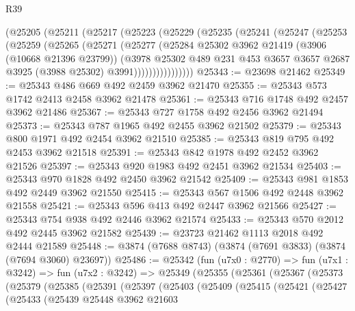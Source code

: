 \begin{lexlean}{R39}
\begin{coremodule}
      (@25205
        (@25211
          (@25217
            (@25223
              (@25229
                (@25235
                  (@25241
                    (@25247
                      (@25253
                        (@25259
                          (@25265
                            (@25271
                              (@25277
                                (@25284
                                  @25302
                                  @3962
                                  @21419
                                  (@3906 (@10668 @21396 @23799))
                                  (@3978
                                    @25302
                                    @489
                                    @231
                                    @453
                                    @3657
                                    @3657
                                    @2687
                                    @3925
                                    (@3988 @25302)
                                    @3991))))))))))))))))
@25343 := @23698 @21462
@25349 := @25343 @486 @669 @492 @2459 @3962 @21470
@25355 := @25343 @573 @1742 @2413 @2458 @3962 @21478
@25361 := @25343 @716 @1748 @492 @2457 @3962 @21486
@25367 := @25343 @727 @1758 @492 @2456 @3962 @21494
@25373 := @25343 @787 @1965 @492 @2455 @3962 @21502
@25379 := @25343 @800 @1971 @492 @2454 @3962 @21510
@25385 := @25343 @819 @795 @492 @2453 @3962 @21518
@25391 := @25343 @842 @1978 @492 @2452 @3962 @21526
@25397 := @25343 @920 @1983 @492 @2451 @3962 @21534
@25403 := @25343 @970 @1828 @492 @2450 @3962 @21542
@25409 := @25343 @981 @1853 @492 @2449 @3962 @21550
@25415 := @25343 @567 @1506 @492 @2448 @3962 @21558
@25421 := @25343 @596 @413 @492 @2447 @3962 @21566
@25427 := @25343 @754 @938 @492 @2446 @3962 @21574
@25433 := @25343 @570 @2012 @492 @2445 @3962 @21582
@25439 := @23723 @21462 @1113 @2018 @492 @2444 @21589
@25448 := @3874 (@7688 @8743) (@3874 (@7691 @3833) (@3874 (@7694 @3060) @23697))
@25486 := @25342
    (fun (u7x0 : @2770) =>
    fun (u7x1 : @3242) =>
    fun (u7x2 : @3242) =>
    @25349
      (@25355
        (@25361
          (@25367
            (@25373
              (@25379
                (@25385
                  (@25391
                    (@25397
                      (@25403
                        (@25409
                          (@25415
                            (@25421
                              (@25427
                                (@25433
                                  (@25439
                                    @25448
                                    @3962
                                    @21603

\end{coremodule}
\end{lexlean}
